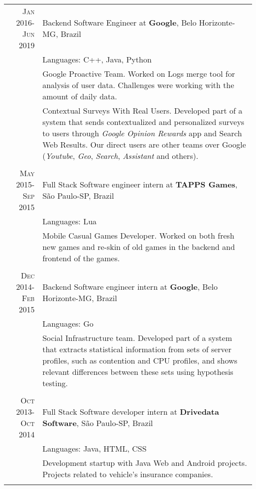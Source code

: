\documentclass[a4paper,10pt]{article} %
\begin{document}
\begin{tabular}{r|p{11cm}}
\textsc{Jan 2016-Jun 2019} & Backend Software Engineer at \textbf{Google}, Belo Horizonte-MG, Brazil \emph{}\\
& \footnotesize{Languages: C++, Java, Python}\\
       & \footnotesize{Google Proactive Team. Worked on Logs merge tool for analysis of user data. Challenges were working with the amount of daily data.} \\
       & \footnotesize{Contextual Surveys With Real Users. Developed part of a system that sends contextualized and personalized surveys to users through \emph{Google Opinion Rewards} app and Search Web Results. Our direct users are other teams over Google (\emph{Youtube}, \emph{Geo}, \emph{Search}, \emph{Assistant} and others).} \\
       \multicolumn{2}{c}{} \\
       

\textsc{May 2015-Sep 2015} & Full Stack Software engineer intern at \textbf{TAPPS Games}, São Paulo-SP, Brazil \emph{}\\
& \footnotesize{Languages: Lua}\\
       & \footnotesize{Mobile Casual Games Developer. Worked on both fresh new games and re-skin of old games in the backend and frontend of the games.} \\
       \multicolumn{2}{c}{} \\
       

\textsc{Dec 2014-Feb 2015} & Backend Software engineer intern at \textbf{Google}, Belo Horizonte-MG, Brazil \emph{}\\
& \footnotesize{Languages: Go}\\
       & \footnotesize{Social Infrastructure team. Developed part of a system that extracts statistical information from sets of server profiles, such as contention and CPU profiles, and shows relevant differences between these sets using hypothesis testing.} \\
       \multicolumn{2}{c}{} \\
       

\textsc{Oct 2013-Oct 2014} & Full Stack Software developer intern at \textbf{Drivedata Software}, São Paulo-SP, Brazil \emph{}\\
& \footnotesize{Languages: Java, HTML, CSS}\\
       & \footnotesize{Development startup with Java Web and Android projects. Projects related to vehicle's insurance companies.} \\
       \multicolumn{2}{c}{} \\
	

\end{tabular}
\end{document}
